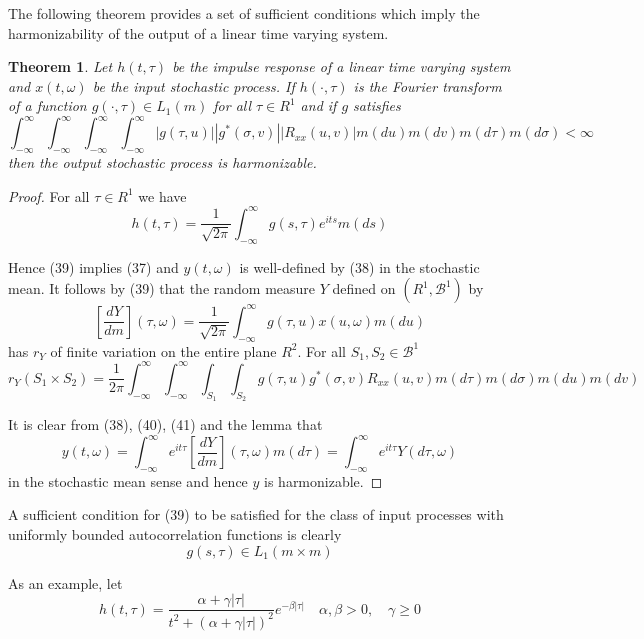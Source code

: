\documentclass{article}
\newtheorem{theorem}{Theorem}
\begin{document}
The following theorem provides a set of sufficient conditions which imply the harmonizability of the output of a linear time varying system.

\begin{theorem}
Let $h(t, \tau)$ be the impulse response of a linear time varying system and $x(t, \omega)$ be the input stochastic process. If $h(\cdot, \tau)$ is the Fourier transform of a function $g(\cdot, \tau) \in L_{1}(m)$ for all $\tau \in R^{1}$ and if $g$ satisfies
\[
\int_{-\infty}^{\infty} \int_{-\infty}^{\infty} \int_{-\infty}^{\infty} \int_{-\infty}^{\infty} |g(\tau, u)||g^{*}(\sigma, v)||R_{x x}(u, v)| m(d u) m(d v) m(d \tau) m(d \sigma)<\infty
\]
then the output stochastic process is harmonizable.
\end{theorem}

\begin{proof}
For all $\tau \in R^{1}$ we have
\[
h(t, \tau)=\frac{1}{\sqrt{2 \pi}} \int_{-\infty}^{\infty} g(s, \tau) e^{i t s} m(d s)
\]

Hence (39) implies (37) and $y(t, \omega)$ is well-defined by (38) in the stochastic mean. It follows by (39) that the random measure $Y$ defined on $(R^{1}, \mathscr{B}^{1})$ by
\[
\left[\frac{d Y}{d m}\right](\tau, \omega)=\frac{1}{\sqrt{2 \pi}} \int_{-\infty}^{\infty} g(\tau, u) x(u, \omega) m(d u)
\]
has $r_{Y}$ of finite variation on the entire plane $R^{2}$. For all $S_{1}, S_{2} \in \mathscr{B}^{1}$
\[
r_{Y}(S_{1} \times S_{2})=\frac{1}{2 \pi} \int_{-\infty}^{\infty} \int_{-\infty}^{\infty} \int_{S_{1}} \int_{S_{2}} g(\tau, u) g^{*}(\sigma, v) R_{x x}(u, v) m(d \tau) m(d \sigma) m(d u) m(d v)
\]

It is clear from (38), (40), (41) and the lemma that
\[
y(t, \omega)=\int_{-\infty}^{\infty} e^{i t \tau}\left[\frac{d Y}{d m}\right](\tau, \omega) m(d \tau)=\int_{-\infty}^{\infty} e^{i t \tau} Y(d \tau, \omega)
\]
in the stochastic mean sense and hence $y$ is harmonizable.
\end{proof}

A sufficient condition for (39) to be satisfied for the class of input processes with uniformly bounded autocorrelation functions is clearly
\[
g(s, \tau) \in L_{1}(m \times m)
\]

As an example, let
\[
h(t, \tau)=\frac{\alpha+\gamma|\tau|}{t^{2}+(\alpha+\gamma|\tau|)^{2}} e^{-\beta|\tau|} \quad \alpha, \beta>0, \quad \gamma \geqslant 0
\]
\end{document}

